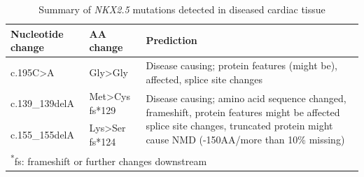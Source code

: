 \begin{refsection}
\begin{table}[!tb]
\centering
\caption{Summary of \textit{NKX2.5} mutations detected in diseased cardiac tissue}
\label{tab:5_5}
\begin{tabular}{  p{1.25in} p{0.75in} p{3in} }
\toprule
	\textbf{Nucleotide change} & \textbf{AA change} & \textbf{Prediction} \\ \toprule
	c.195C>A & Gly>Gly & Disease causing; protein features (might be), affected, splice site changes \\ \midrule
	c.139\_139delA & Met>Cys fs*129 & \multirow{2}{3in}{Disease causing; amino acid sequence changed, frameshift, protein features might be affected splice site changes, truncated protein might cause NMD (-150AA/more than 10\% missing)} \\ 
	c.155\_155delA & Lys>Ser  fs*124 &  \\ \bottomrule
\multicolumn{3}{l}{\textsuperscript{*}\footnotesize{fs: frameshift or further changes downstream}}\\
\end{tabular}
\end{table}


\end{refsection}
